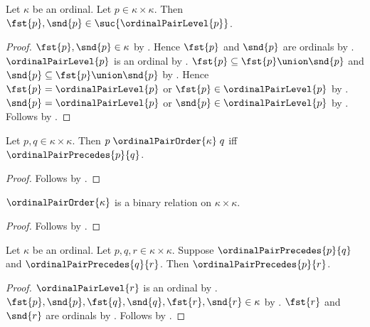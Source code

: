 \begin{proposition}\label{ordinal_pair_coordinates_below_successor_level}
    Let $\kappa$ be an ordinal.
    Let $p\in\kappa\times\kappa$.
    Then $\fst{p},\snd{p}\in\suc{\ordinalPairLevel{p}}$.
\end{proposition}
\begin{proof}
    $\fst{p},\snd{p}\in\kappa$ by .
    Hence $\fst{p}$ and $\snd{p}$ are ordinals
        by .
    $\ordinalPairLevel{p}$ is an ordinal
        by .
    $\fst{p}\subseteq\fst{p}\union\snd{p}$ and
        $\snd{p}\subseteq\fst{p}\union\snd{p}$
        by .
    Hence $\fst{p}=\ordinalPairLevel{p}$ or
        $\fst{p}\in\ordinalPairLevel{p}$
        by .
    $\snd{p}=\ordinalPairLevel{p}$ or
        $\snd{p}\in\ordinalPairLevel{p}$
        by .
    Follows by .
\end{proof}

\begin{proposition}\label{ordinal_pair_order_iff}
    Let $p,q\in\kappa\times\kappa$.
    Then $p\mathrel{\ordinalPairOrder{\kappa}}q$ iff
        $\ordinalPairPrecedes{p}{q}$.
\end{proposition}
\begin{proof}
    Follows by
        .
\end{proof}

\begin{proposition}\label{ordinal_pair_order_binary}
    $\ordinalPairOrder{\kappa}$ is a binary relation on
        $\kappa\times\kappa$.
\end{proposition}
\begin{proof}
    Follows by .
\end{proof}

\begin{proposition}\label{ordinal_pair_precedes_transitive}
    Let $\kappa$ be an ordinal.
    Let $p,q,r\in\kappa\times\kappa$.
    Suppose $\ordinalPairPrecedes{p}{q}$ and
        $\ordinalPairPrecedes{q}{r}$.
    Then $\ordinalPairPrecedes{p}{r}$.
\end{proposition}
\begin{proof}
    $\ordinalPairLevel{r}$ is an ordinal
        by .
    $\fst{p},\snd{p},\fst{q},\snd{q},\fst{r},\snd{r}\in\kappa$
        by .
    $\fst{r}$ and $\snd{r}$ are ordinals
        by .
    Follows by .
\end{proof}

